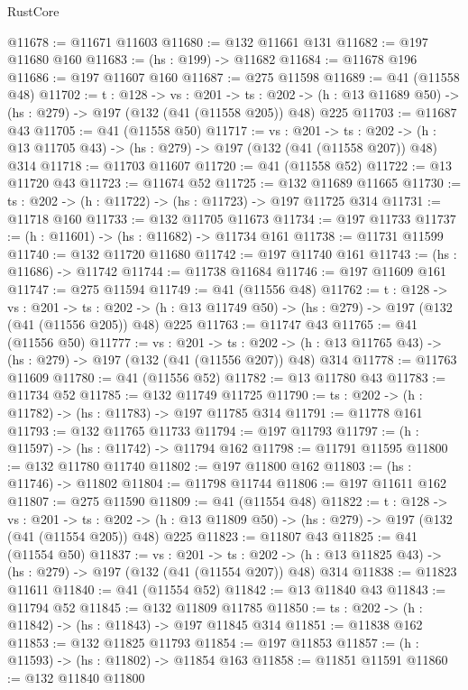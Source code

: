 \begin{lexlean}{RustCore}
\begin{coremodule}
@11678 := @11671 @11603
@11680 := @132 @11661 @131
@11682 := @197 @11680 @160
@11683 := (hs : @199) -> @11682
@11684 := @11678 @196
@11686 := @197 @11607 @160
@11687 := @275 @11598
@11689 := @41 (@11558 @48)
@11702 := {t : @128} ->
  {vs : @201} ->
  {ts : @202} -> (h : @13 @11689 @50) -> (hs : @279) -> @197 (@132 (@41 (@11558 @205)) @48) @225
@11703 := @11687 @43
@11705 := @41 (@11558 @50)
@11717 := {vs : @201} ->
  {ts : @202} -> (h : @13 @11705 @43) -> (hs : @279) -> @197 (@132 (@41 (@11558 @207)) @48) @314
@11718 := @11703 @11607
@11720 := @41 (@11558 @52)
@11722 := @13 @11720 @43
@11723 := @11674 @52
@11725 := @132 @11689 @11665
@11730 := {ts : @202} -> (h : @11722) -> (hs : @11723) -> @197 @11725 @314
@11731 := @11718 @160
@11733 := @132 @11705 @11673
@11734 := @197 @11733
@11737 := (h : @11601) -> (hs : @11682) -> @11734 @161
@11738 := @11731 @11599
@11740 := @132 @11720 @11680
@11742 := @197 @11740 @161
@11743 := (hs : @11686) -> @11742
@11744 := @11738 @11684
@11746 := @197 @11609 @161
@11747 := @275 @11594
@11749 := @41 (@11556 @48)
@11762 := {t : @128} ->
  {vs : @201} ->
  {ts : @202} -> (h : @13 @11749 @50) -> (hs : @279) -> @197 (@132 (@41 (@11556 @205)) @48) @225
@11763 := @11747 @43
@11765 := @41 (@11556 @50)
@11777 := {vs : @201} ->
  {ts : @202} -> (h : @13 @11765 @43) -> (hs : @279) -> @197 (@132 (@41 (@11556 @207)) @48) @314
@11778 := @11763 @11609
@11780 := @41 (@11556 @52)
@11782 := @13 @11780 @43
@11783 := @11734 @52
@11785 := @132 @11749 @11725
@11790 := {ts : @202} -> (h : @11782) -> (hs : @11783) -> @197 @11785 @314
@11791 := @11778 @161
@11793 := @132 @11765 @11733
@11794 := @197 @11793
@11797 := (h : @11597) -> (hs : @11742) -> @11794 @162
@11798 := @11791 @11595
@11800 := @132 @11780 @11740
@11802 := @197 @11800 @162
@11803 := (hs : @11746) -> @11802
@11804 := @11798 @11744
@11806 := @197 @11611 @162
@11807 := @275 @11590
@11809 := @41 (@11554 @48)
@11822 := {t : @128} ->
  {vs : @201} ->
  {ts : @202} -> (h : @13 @11809 @50) -> (hs : @279) -> @197 (@132 (@41 (@11554 @205)) @48) @225
@11823 := @11807 @43
@11825 := @41 (@11554 @50)
@11837 := {vs : @201} ->
  {ts : @202} -> (h : @13 @11825 @43) -> (hs : @279) -> @197 (@132 (@41 (@11554 @207)) @48) @314
@11838 := @11823 @11611
@11840 := @41 (@11554 @52)
@11842 := @13 @11840 @43
@11843 := @11794 @52
@11845 := @132 @11809 @11785
@11850 := {ts : @202} -> (h : @11842) -> (hs : @11843) -> @197 @11845 @314
@11851 := @11838 @162
@11853 := @132 @11825 @11793
@11854 := @197 @11853
@11857 := (h : @11593) -> (hs : @11802) -> @11854 @163
@11858 := @11851 @11591
@11860 := @132 @11840 @11800

\end{coremodule}
\end{lexlean}
